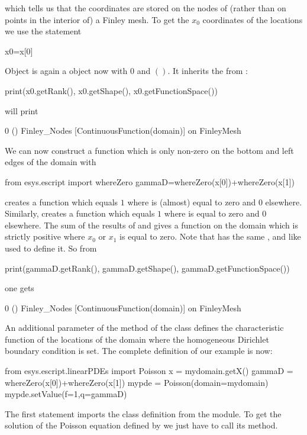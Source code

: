 which tells us that the coordinates are stored on the nodes of (rather than on
points in the interior of) a Finley mesh.
To get the  $x_{0}$ coordinates of the locations we use the statement 
\begin{python}
  x0=x[0]
\end{python}
Object  is again a \Data object now with \Rank $0$ and \Shape $()$.
It inherits the \FunctionSpace from :
\begin{python}
  print(x0.getRank(), x0.getShape(), x0.getFunctionSpace())
\end{python}
will print
\begin{python}
  0 () Finley_Nodes [ContinuousFunction(domain)] on FinleyMesh
\end{python}
We can now construct a function  which is only non-zero on the
bottom and left edges of the domain with
\begin{python}
  from esys.escript import whereZero
  gammaD=whereZero(x[0])+whereZero(x[1])
\end{python}

 creates a function which equals $1$ where  is (almost) equal to zero and $0$ elsewhere. 
Similarly,  creates a function which equals $1$ where  is equal to zero and $0$ elsewhere.
The sum of the results of  and 
gives a function on the domain  which is strictly positive where $x_{0}$ or $x_{1}$ is equal to zero.
Note that  has the same \Rank, \Shape and \FunctionSpace like  used to define it.
So from 
\begin{python}
  print(gammaD.getRank(), gammaD.getShape(), gammaD.getFunctionSpace())
\end{python}
one gets 
\begin{python}
  0 () Finley_Nodes [ContinuousFunction(domain)] on FinleyMesh
\end{python}
An additional parameter  of the  method of the \Poisson
class defines the characteristic function of
the locations of the domain where the homogeneous Dirichlet boundary condition is set.
The complete definition of our example is now:
\begin{python}
  from esys.escript.linearPDEs import Poisson
  x = mydomain.getX()
  gammaD = whereZero(x[0])+whereZero(x[1])
  mypde = Poisson(domain=mydomain)
  mypde.setValue(f=1,q=gammaD)
\end{python}
The first statement imports the \Poisson class definition from the \linearPDEs module.
To get the solution of the Poisson equation defined by  we just have to call its  method. 


